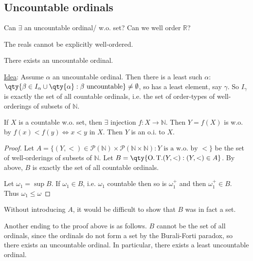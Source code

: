 \subsection{Uncountable ordinals}
\begin{question}
    Can $\exists$ an uncountable ordinal/ w.o. set?
    Can we well order $\mathbb{R}$?
\end{question}

\begin{answer}
    The reals cannot be explicitly well-ordered.
\end{answer}

\begin{theorem} \label{thm:12}
    There exists an uncountable ordinal.
\end{theorem}

\underline{Idea}: Assume $\alpha$ an uncountable ordinal.
Then there is a least such $\alpha$: \\
$\qty{\beta \in I_\alpha \cup \qty{\alpha} : \beta \text{ uncountable}} \neq \emptyset$, so has a least element, say $\gamma$.
So $I_\gamma$ is exactly the set of all countable ordinals, i.e. the set of order-types of well-orderings of subsets of $\mathbb{N}$.

If $X$ is a countable w.o. set, then $\exists$ injection $f : X \to \mathbb{N}$.
Then $Y = f(X)$ is w.o. by $f(x) < f(y) \iff x < y$ in $X$.
Then $Y$ is an o.i. to $X$.

\begin{proof}
    Let $A = \{(Y, <) \in \mathcal{P}(\mathbb{N}) \times \mathcal{P}(\mathbb{N} \times \mathbb{N}) : Y \text{ is a w.o. by } <\}$ be the set of well-orderings of subsets of $\mathbb{N}$.
    Let $B = \qty{\operatorname{O.T.}(Y, <) : (Y, <) \in A}$.
    By above, $B$ is exactly the set of all countable ordinals.

    Let $\omega_1 = \sup B$.
    If $\omega_1 \in B$, i.e. $\omega_1$ countable then so is $\omega_1^+$ and then $\omega_1^+ \in B$.
    Thus $\omega_1 \leq \omega$ \Lightning
\end{proof}

\begin{remark}
    Without introducing $A$, it would be difficult to show that $B$ was in fact a set.
\end{remark}

\begin{remark}
    Another ending to the proof above is as follows.
    $B$ cannot be the set of all ordinals, since the ordinals do not form a set by the Burali-Forti paradox, so there exists an uncountable ordinal.
    In particular, there exists a least uncountable ordinal.
\end{remark}

